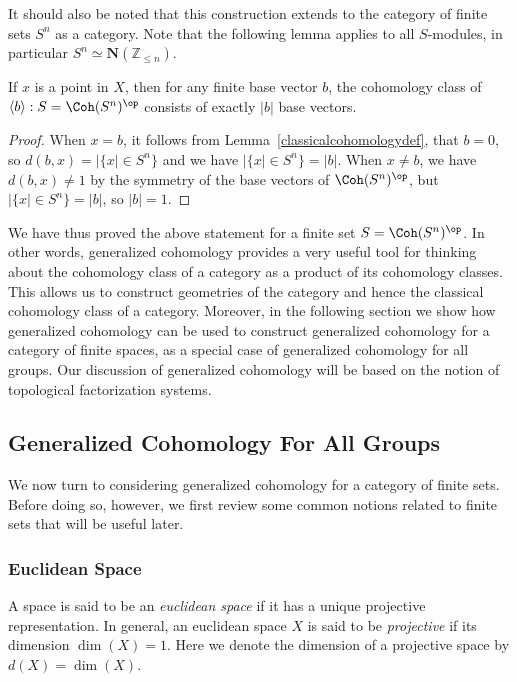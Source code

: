 \documentclass[a4paper,reqno,oneside]{article}
\begin{document}
It should also be noted that this construction extends to the category of finite sets $S^n$ as a category. Note that the following lemma applies to all $S$-modules, in particular $S^n \simeq \mathbf{N}(\mathbb{Z}_{\le n})$.
\begin{lemma}
	If $x$ is a point in $X$, then for any finite base vector $b$, the cohomology class of $\langle b \rangle : S = \Coh(S^n)^{\op}$ consists of exactly $|b|$ base vectors.
\end{lemma}
\begin{proof}
	When $x = b$, it follows from Lemma~\ref{classicalcohomologydef}, that $b = 0$, so $d(b, x) = |\{x| \in S^n\}$ and we have $|\{x| \in S^n\} = |b|$. When $x \neq b$, we have $d(b, x) \neq 1$ by the symmetry of the base vectors of $\Coh(S^n)^{\op}$, but $|\{x| \in S^n\} = |b|$, so $|b| = 1$.
\end{proof}

We have thus proved the above statement for a finite set $S = \Coh(S^n)^{\op}$. In other words, generalized cohomology provides a very useful tool for thinking about the cohomology class of a category as a product of its cohomology classes. This allows us to construct geometries of the category and hence the classical cohomology class of a category. Moreover, in the following section we show how generalized cohomology can be used to construct generalized cohomology for a category of finite spaces, as a special case of generalized cohomology for all groups. Our discussion of generalized cohomology will be based on the notion of topological factorization systems. 

\subsection{Generalized Cohomology For All Groups}
We now turn to considering generalized cohomology for a category of finite sets. Before doing so, however, we first review some common notions related to finite sets that will be useful later.

\subsubsection{Euclidean Space}
A space is said to be an \textit{euclidean space} if it has a unique projective representation. In general, an euclidean space $X$ is said to be \textit{projective} if its dimension $\dim(X) = 1$. Here we denote the dimension of a projective space by $d(X) = \dim(X)$.
\end{document}
